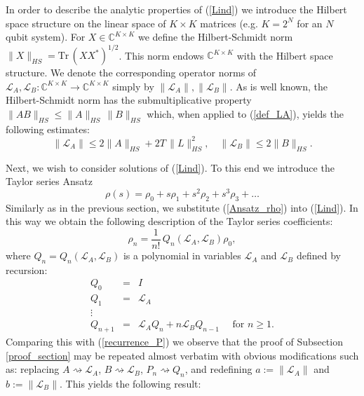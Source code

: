 \documentclass[11 pt]{article}
\begin{document}
In order to describe the analytic properties of (\ref{Lind}) we introduce the Hilbert space structure on the linear space of $K\times K$ matrices (e.g. $K = 2^N$ for an $N$ qubit system). For $X\in \mathbb{C}^{K\times K}$ we define the Hilbert-Schmidt norm $\|X \|_{HS} = \mbox{Tr}\, (XX^*)^{1/2}$. This norm endows $\mathbb{C}^{K\times K}$ with the Hilbert space structure.  We denote the corresponding operator norms of $\mathcal{L}_A, \mathcal{L}_B:  \mathbb{C}^{K\times K} \rightarrow \mathbb{C}^{K\times K}$ simply by $\|\mathcal{L}_A \|, \|\mathcal{L}_B \|$. As is well known, the Hilbert-Schmidt norm has the submultiplicative property $\|A B\|_{HS}\leq \|A \|_{HS} \,\|B \|_{HS}$ which, when applied to (\ref{def_LA}), yields the following estimates:
 \begin{equation}\label{norm_est}
\|\mathcal{L}_A \| \leq 2 \|A\|_{HS} + 2 T\, \|L\|_{HS} ^2, \quad \|\mathcal{L}_B \| \leq 2 \|B\|_{HS} .
 \end{equation}

 Next, we wish to consider solutions of (\ref{Lind}). To this end we introduce the Taylor series Ansatz
\begin{equation}\label{Ansatz_rho}
\rho(s) = \rho_0 +s\rho_1 +s^2\rho_2 + s^3\rho_3+\ldots
\end{equation}
Similarly as in the previous section, we substitute (\ref{Ansatz_rho}) into (\ref{Lind}). In this way we obtain the following description of the Taylor series coefficients:
\begin{equation} \label{rho_n}
 \rho_n = \frac{1}{n!}\, Q_n(\mathcal{L}_A , \mathcal{L}_B ) \rho_0,
\end{equation}
where $ Q_n = Q_n(\mathcal{L}_A , \mathcal{L}_B )$ is a polynomial in variables $\mathcal{L}_A$ and $\mathcal{L}_B$ defined by recursion:
\begin{equation}\label{recurrence_Q}
\begin{array}{lll}
Q_0 &= &I \\
Q_1  &=& \mathcal{L}_A  \\
\vdots & &\\
Q_{n+1} & = & \mathcal{L}_A Q_n + n \mathcal{L}_B Q_{n-1}\quad \mbox{ for } n\geq 1.
\end{array}
\end{equation}
Comparing this with (\ref{recurrence_P}) we observe that the proof of Subsection \ref{proof_section} may be repeated almost verbatim with obvious modifications such as: replacing  $A\rightsquigarrow\mathcal{L}_A$,  $B\rightsquigarrow \mathcal{L}_B$, $P_n \rightsquigarrow Q_n$, and redefining  $a:=\|\mathcal{L}_A\|$ and $b:=\|\mathcal{L}_B\|$. This yields the following result:
\end{document}
